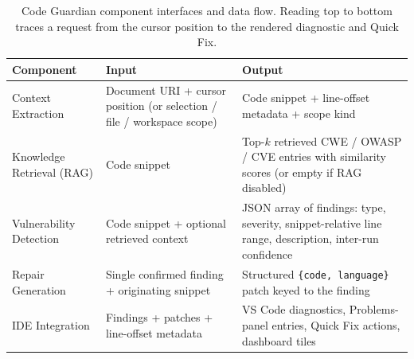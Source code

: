 \begin{table}[!htbp]
  \centering
  \caption[Component interfaces and data flow.]{Code Guardian component interfaces and data flow. Reading top to bottom traces a request from the cursor position to the rendered diagnostic and Quick Fix.}
  \label{tab:concept-component-interfaces}
  \footnotesize
  \renewcommand{\arraystretch}{1.3}
  \begin{tabularx}{\textwidth}{p{}p{}X}
    \toprule
    \textbf{Component} & \textbf{Input} & \textbf{Output} \\
    \midrule
    Context Extraction & Document URI + cursor position (or selection / file / workspace scope) & Code snippet + line-offset metadata + scope kind \\
    Knowledge Retrieval (RAG) & Code snippet & Top-$k$ retrieved CWE / OWASP / CVE entries with similarity scores (or empty if RAG disabled) \\
    Vulnerability Detection & Code snippet + optional retrieved context & JSON array of findings: type, severity, snippet-relative line range, description, inter-run confidence \\
    Repair Generation & Single confirmed finding + originating snippet & Structured \texttt{\{code, language\}} patch keyed to the finding \\
    IDE Integration & Findings + patches + line-offset metadata & VS Code diagnostics, Problems-panel entries, Quick Fix actions, dashboard tiles \\
    \bottomrule
  \end{tabularx}
\end{table}
